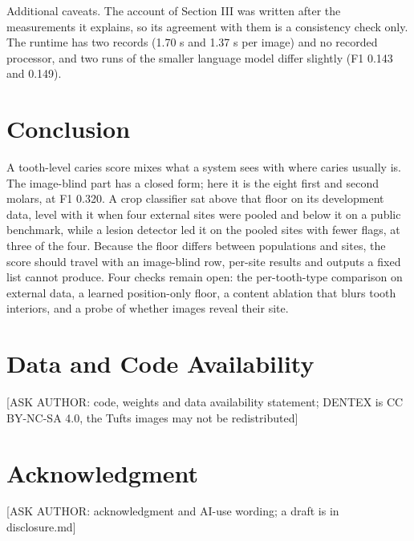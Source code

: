 \documentclass[conference]{IEEEtran}
\begin{document}
Additional caveats. The account of Section III was written after the measurements it explains, so its agreement with them is a consistency check only. The runtime has two records (1.70 s and 1.37 s per image) and no recorded processor, and two runs of the smaller language model differ slightly (F1 0.143 and 0.149).

\section{Conclusion}

A tooth-level caries score mixes what a system sees with where caries usually is. The image-blind part has a closed form; here it is the eight first and second molars, at F1 0.320. A crop classifier sat above that floor on its development data, level with it when four external sites were pooled and below it on a public benchmark, while a lesion detector led it on the pooled sites with fewer flags, at three of the four. Because the floor differs between populations and sites, the score should travel with an image-blind row, per-site results and outputs a fixed list cannot produce. Four checks remain open: the per-tooth-type comparison on external data, a learned position-only floor, a content ablation that blurs tooth interiors, and a probe of whether images reveal their site.

\section*{Data and Code Availability}

[ASK AUTHOR: code, weights and data availability statement; DENTEX is CC BY-NC-SA 4.0, the Tufts images may not be redistributed]

\section*{Acknowledgment}

[ASK AUTHOR: acknowledgment and AI-use wording; a draft is in disclosure.md]



\end{document}

